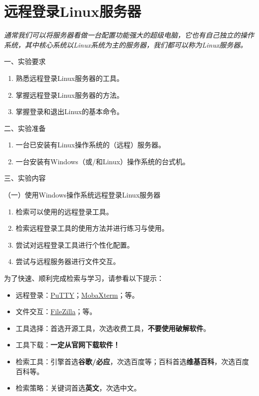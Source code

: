 \chapter{远程登录Linux服务器}

{\itshape
通常我们可以将服务器看做一台配置功能强大的超级电脑，它也有自己独立的操作系统，其中核心系统以Linux系统为主的服务器，我们都可以称为Linux服务器。
}

\vspace{0.2in}
\noindent
一、实验要求
\begin{enumerate}
  \item 熟悉远程登录Linux服务器的工具。
  \item 掌握远程登录Linux服务器的方法。
  \item 掌握登录和退出Linux的基本命令。
\end{enumerate}

\vspace{0.2in}
\noindent
二、实验准备
\begin{enumerate}
  \item 一台已安装有Linux操作系统的（远程）服务器。
  \item 一台安装有Windows（或/和Linux）操作系统的台式机。
\end{enumerate}

\vspace{0.2in}
\noindent
三、实验内容

\vspace{0.1in}
（一）使用Windows操作系统远程登录Linux服务器
\begin{enumerate}
  \item 检索可以使用的远程登录工具。
  \item 检索远程登录工具的使用方法并进行练习与使用。
  \item 尝试对远程登录工具进行个性化配置。
  \item 尝试与远程服务器进行文件交互。
\end{enumerate}

为了快速、顺利完成检索与学习，请参看以下提示：
\begin{itemize}
  \item 远程登录：\href{https://www.putty.org/}{PuTTY}；\href{https://mobaxterm.mobatek.net/}{MobaXterm}；等。
  \item 文件交互：\href{https://filezilla-project.org/}{FileZilla}；等。
  \item 工具选择：首选开源工具，次选收费工具，\textbf{不要使用破解软件}。
  \item 工具下载：\textbf{一定从官网下载软件！}
  \item 检索工具：引擎首选\textbf{谷歌/必应}，次选百度等；百科首选\textbf{维基百科}，次选百度百科等。
  \item 检索策略：关键词首选\textbf{英文}，次选中文。
\end{itemize}

